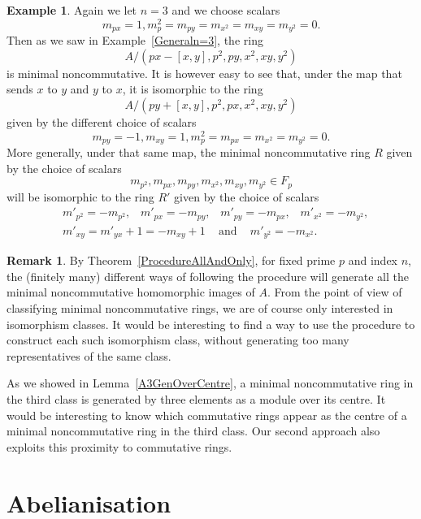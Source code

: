 \documentclass[11pt]{article}
\theoremstyle{definition}
\newtheorem{numberedexample}[corollary]{Example}
\newtheorem{remark}[corollary]{Remark}
\begin{document}
\begin{numberedexample}\label{IsomorphicDifferentScalars}
Again we let $n=3$ and we choose scalars
\[m_{px}=1,m_p^2=m_{py}=m_{x^2}=m_{xy}=m_{y^2}=0.\]
Then as we saw in Example~\ref{Generaln=3}, the ring
\[A/\left(px-[x,y],p^2,py,x^2,xy,y^2\right)\]
is minimal noncommutative. It is however easy to see that, under the map that sends $x$ to $y$ and $y$ to $x$, it is isomorphic to the ring
\[A/\left(py+[x,y],p^2,px,x^2,xy,y^2\right)\]
given by the different choice of scalars
\[m_{py}=-1,m_{xy}=1,m_p^2=m_{px}=m_{x^2}=m_{y^2}=0.\]
More generally, under that same map, the minimal noncommutative ring $R$ given by the choice of scalars
\[m_{p^2},m_{px},m_{py},m_{x^2},m_{xy},m_{y^2}\in F_p\]
will be isomorphic to the ring $R'$ given by the choice of scalars
\begin{align*}
&m'_{p^2}=-m_{p^2},\hspace{10pt} m'_{px}=-m_{py},\hspace{10pt} m'_{py}=-m_{px},\hspace{10pt}m'_{x^2}=-m_{y^2},\\
&m'_{xy}=m'_{yx}+1=-m_{xy}+1\hspace{10pt} \text{ and }\hspace{10pt}m'_{y^2}=-m_{x^2}.
\end{align*}
\end{numberedexample}

\begin{remark}
By Theorem~\ref{ProcedureAllAndOnly}, for fixed prime $p$ and index $n$, the (finitely many) different ways of following the procedure will generate all the minimal noncommutative homomorphic images of $A$. From the point of view of classifying minimal noncommutative rings, we are of course only interested in isomorphism classes. It would be interesting to find a way to use the procedure to construct each such isomorphism class, without generating too many representatives of the same class.

As we showed in Lemma~\ref{A3GenOverCentre}, a minimal noncommutative ring in the third class is generated by three elements as a module over its centre. It would be interesting to know which commutative rings appear as the centre of a minimal noncommutative ring in the third class. Our second approach also exploits this proximity to commutative rings.
\end{remark}

\section{Abelianisation}\label{Abelianisation}
\end{document}
